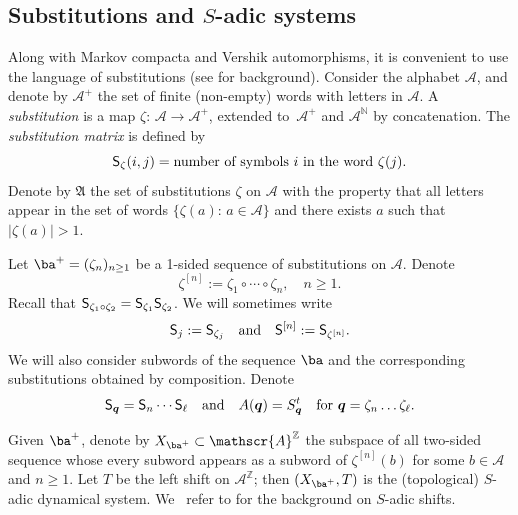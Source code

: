 \documentclass[10pt]{amsart}
\let\mathcal\mathscr
\theoremstyle{plain}
\theoremstyle{definition}
\newcommand\bq{{\boldsymbol q}}
\newcommand\FrA{\mathfrak{A}}
\newcommand\Ak{\mathcal{A}}
\newcommand\A{\mathcal{A}}
\newcommand{\Z}{\mathbb{Z}}
\newcommand{\N}{\mathbb{N}}
\newcommand\Sf{{\sf S}}
\newcommand\be{\begin{equation}}
\newcommand\ee{\end{equation}}
\begin{document}
\subsection{Substitutions and $S$-adic systems} \label{sec-Sadic}
Along with Markov compacta and Vershik automorphisms, it is convenient to use the language of {substitutions} (see \cite{Queff,Fogg} for background). Consider the
alphabet $\Ak$, and denote by $\Ak^+$ the set of finite (non-empty) words with letters in $\Ak$. A \emph{substitution} is a map $\zeta:\,\A\to \A^+$, extended to~$\A^+$ and $\A^{\N}$ by concatenation.
The \emph{substitution matrix} is defined by
\be \label{sub-mat}
\Sf_\zeta (i,j) = \text{number of symbols}\ i\ \text{in the word}\ \zeta(j).
\ee
Denote by $\FrA$ the set of substitutions $\zeta$ on $\Ak$ with the property that all letters appear in the set of words $\{\zeta(a):\,a\in \Ak\}$ and there exists $a$ such that $|\zeta(a)|>1$.

Let $\ba^+ =(\zeta_n)_{n\ge 1}$ be a 1-sided sequence of substitutions on $\Ak$. Denote
\[
\zeta^{[n]} := \zeta_1\circ \cdots\circ\zeta_n,\quad n\ge 1.
\]
Recall that $\Sf_{\zeta_1\circ \zeta_2} = \Sf_{\zeta_1}\Sf_{\zeta_2}$.
We will sometimes write
\[
\Sf_j:= \Sf_{\zeta_j}\quad \text{and}\quad \Sf^{[n]}:= \Sf_{\zeta^{[n]}}.
\]
We will also consider subwords of the sequence $\ba$ and the corresponding substitutions obtained by composition. Denote
\be \label{notation1}
\Sf_\bq = \Sf_n\cdots \Sf_\ell\quad \text{and}\quad A(\bq) = S_\bq^t\quad \text{for }\bq = \zeta_{n}\ldots\zeta_{\ell}.
\ee

Given $\ba^+$, denote by $X_{\ba^+}\subset \Ak^\Z$ the subspace of all two-sided sequence whose every subword appears as a subword of
$\zeta^{[n]}(b)$ for some $b\in \Ak$ and $n\ge 1$. Let $T$ be the left shift on $\Ak^\Z$; then $(X_{\ba^+},T)$ is the (topological) $S$-adic dynamical system.
We~ refer to \cite{BD,BST_2019,BSTY} for the background on $S$-adic shifts.
\end{document}
